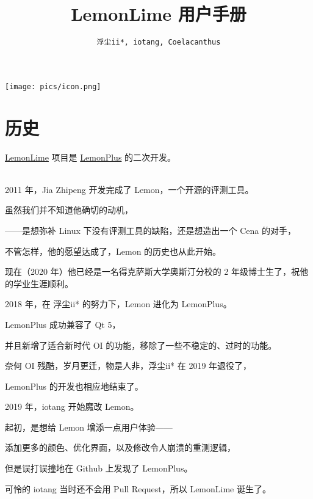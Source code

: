 \documentclass[UTF-8]{ctexart}
\title{\textbf{\huge LemonLime 用户手册}}
\author{\texttt{浮尘ii*, iotang, Coelacanthus}}
\begin{document}
    \maketitle

    \begin{center}
        \texttt{[image: pics/icon.png]}
    \end{center}
    \newpage

    \tableofcontents

    \newpage

    \section{历史}

    \href{https://github.com/Project-LemonLime/Project_LemonLime}{LemonLime} 项目是 \href{https://github.com/Dust1404/Project_LemonPlus}{LemonPlus} 的二次开发。

    ~\\

    2011 年，Jia Zhipeng 开发完成了 Lemon，一个开源的评测工具。

    虽然我们并不知道他确切的动机，

    ——是想弥补 Linux 下没有评测工具的缺陷，还是想造出一个 Cena 的对手，

    不管怎样，他的愿望达成了，Lemon 的历史也从此开始。

    现在（2020 年）他已经是一名得克萨斯大学奥斯汀分校的 2 年级博士生了，祝他的学业生涯顺利。\newline

    2018 年，在 浮尘ii* 的努力下，Lemon 进化为 LemonPlus。

    LemonPlus 成功兼容了 Qt 5，

    并且新增了适合新时代 OI 的功能，移除了一些不稳定的、过时的功能。

    奈何 OI 残酷，岁月更迁，物是人非，浮尘ii* 在 2019 年退役了，

    LemonPlus 的开发也相应地结束了。\newline

    2019 年，iotang 开始魔改 Lemon。

    起初，是想给 Lemon 增添一点用户体验——

    添加更多的颜色、优化界面，以及修改令人崩溃的重测逻辑，

    但是误打误撞地在 Github 上发现了 LemonPlus。

    可怜的 iotang 当时还不会用 Pull Request，所以 LemonLime 诞生了。
\end{document}
